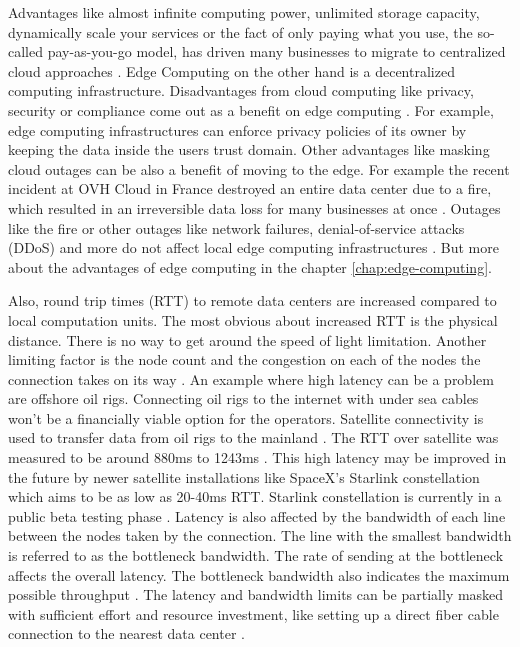 \bigskip
Advantages like almost infinite computing power, unlimited storage capacity, dynamically scale your services or the fact of only paying what you use, the so-called pay-as-you-go model, has driven many businesses to migrate to centralized cloud approaches \cite{APOSTU2013}. Edge Computing on the other hand is a decentralized computing infrastructure. Disadvantages from cloud computing like privacy, security or compliance come out as a benefit on edge computing \cite{IndustrialInternetConsortium2018}. For example, edge computing infrastructures can enforce privacy policies of its owner by keeping the data inside the users trust domain\cite{Shi2016a}. Other advantages like masking cloud outages \cite{Shi2016a} can be also a benefit of moving to the edge. For example the recent incident at OVH Cloud in France destroyed an entire data center due to a fire, which resulted in an irreversible data loss for many businesses at once \cite{Holland2021}. Outages like the fire or other outages like network failures, denial-of-service attacks (DDoS) and more do not affect local edge computing infrastructures \cite{Shi2016a}. But more about the advantages of edge computing in the chapter \ref{chap:edge-computing}. 

\bigskip
Also, round trip times (RTT) to remote data centers are increased compared to local computation units. The most obvious about increased RTT is the physical distance. There is no way to get around the speed of light limitation. Another limiting factor is the node count and the congestion on each of the nodes the connection takes on its way \cite{Cloudflarea}. An example where high latency can be a problem are offshore oil rigs. Connecting oil rigs to the internet with under sea cables won’t be a financially viable option for the operators. Satellite connectivity is used to transfer data from oil rigs to the mainland \cite{HaglandHansen}. The RTT over satellite was measured to be around 880ms to 1243ms \cite{Bisu2018}. This high latency may be improved in the future by newer satellite installations like SpaceX’s Starlink constellation which aims to be as low as 20-40ms RTT. Starlink constellation is currently in a public beta testing phase \cite{Grush2020}. Latency is also affected by the bandwidth of each line between the nodes taken by the connection. The line with the smallest bandwidth is referred to as the bottleneck bandwidth. The rate of sending at the bottleneck affects the overall latency. The bottleneck bandwidth also indicates the maximum possible throughput \cite{Gettys2011}. The latency and bandwidth limits can be partially masked with sufficient effort and resource investment, like setting up a direct fiber cable connection to the nearest data center \cite{Shi2016a}.

